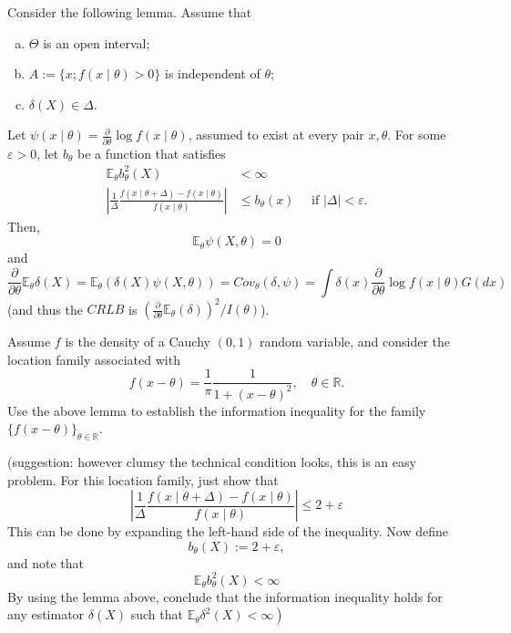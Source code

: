 \begin{ex}
    Consider the following lemma. Assume that 
    \begin{enumerate}[(a)]
        \item \(\Theta\) is an open interval; 
        \item  \(A:=\{x ; f(x \mid \theta)>0\}\) is independent of \(\theta\); 
        \item \(\delta(X) \in \Delta\). 
    \end{enumerate}
    Let \(\psi(x \mid \theta)=\frac{\partial}{\partial \theta} \log f(x \mid \theta)\), assumed to exist at every pair \(x, \theta\). For some \(\varepsilon>0\), let \(b_{\theta}\) be a function that satisfies
    \[
    \begin{aligned}
    \mathbb{E}_{\theta} b_{\theta}^{2}(X) &<\infty \\
    \left|\frac{1}{\Delta} \frac{f(x \mid \theta+\Delta)-f(x \mid \theta)}{f(x \mid \theta)}\right| & \leq b_{\theta}(x) \quad \text { if }|\Delta|<\varepsilon .
    \end{aligned}
    \]
    Then,
    \[
    \mathbb{E}_{\theta} \psi(X, \theta)=0
    \]
    and
    \[
    \frac{\partial}{\partial \theta} \mathbb{E}_{\theta} \delta(X)=\mathbb{E}_{\theta}(\delta(X) \psi(X, \theta))= Cov_{\theta}(\delta, \psi)=\int \delta(x) \frac{\partial}{\partial \theta} \log f(x \mid \theta) G(d x)
    \]
    (and thus the \(C R L B\) is \(\left(\frac{\partial}{\partial \theta} \mathbb{E}_{\theta}(\delta)\right)^{2} / I(\theta)\)).

    Assume \(f\) is the density of a Cauchy \((0,1)\) random variable, and consider the location family associated with
    \[
    f(x-\theta)=\frac{1}{\pi} \frac{1}{1+(x-\theta)^{2}}, \quad \theta \in \mathbb{R} .
    \]
    Use the above lemma to establish the information inequality for the family \(\{f(x-\theta)\}_{\theta \in \mathbb{R}}\). 
    
    (suggestion: however clumsy the technical condition looks, this is an easy problem. For this location family, just show that
    \[
    \left|\frac{1}{\Delta} \frac{f(x \mid \theta+\Delta)-f(x \mid \theta)}{f(x \mid \theta)}\right| \leq 2+\varepsilon
    \]
    This can be done by expanding the left-hand side of the inequality. Now define
    \[
    b_{\theta}(X):=2+\varepsilon,
    \]
    and note that
    \[
    \mathbb{E}_{\theta} b_{\theta}^{2}(X)<\infty
    \]
    By using the lemma above, conclude that the information inequality holds for any estimator \(\delta(X)\) such that \(\left.\mathbb{E}_{\theta} \delta^{2}(X)<\infty\right)\)
\end{ex}

